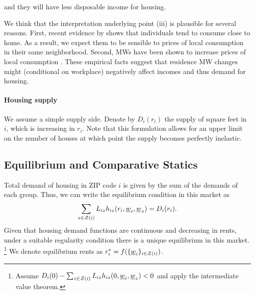 and they will have less disposable income for housing.

We think that the interpretation underlying point (iii) is plausible for several 
reasons.
First, recent evidence by \textcite{MiyauchiEtAl2021} shows that individuals tend 
to consume close to home.
As a result, we expect them to be sensible to prices of local consumption in their 
same neighborhood.
Second, MWs have been shown to increase prices of local consumption 
\parencite[e.g.,][]{AllegrettoReich2018, LeungForthcoming}.
These empirical facts suggest that residence MW changes might (conditional on workplace)
negatively affect incomes and thus demand for housing.

\paragraph{Housing supply}

We assume a simple supply side. Denote by $D_i(r_i)$ the supply of square feet in 
$i$, which is increasing in $r_i$.
Note that this formulation allows for an upper limit on the number of houses at 
which point the supply becomes perfectly inelastic.

\subsection{Equilibrium and Comparative Statics}

Total demand of housing in ZIP code $i$ is given by the sum of the demands of each group. 
Thus, we can write the equilibrium condition in this market as
\begin{equation}\label{eq:equilibrium}
	\sum_{z\in\mathcal{Z}(i)} L_{iz} h_{iz} (r_i, \underline{w}_i, \underline{w}_z) = D_i(r_i) .
\end{equation}
Given that housing demand functions are continuous and decreasing in rents, 
under a suitable regularity condition there is a unique equilibrium in this market.%
\footnote{Assume $D_i(0) - \sum_{z\in\mathcal{Z}(i)} L_{iz} h_{iz} (0, \underline{w}_i, \underline{w}_z) < 0$
and apply the intermediate value theorem.}
We denote equilibrium rents as $r^*_i = f(\{\underline{w}_i\}_{i\in\mathcal{Z}(i)})$.


